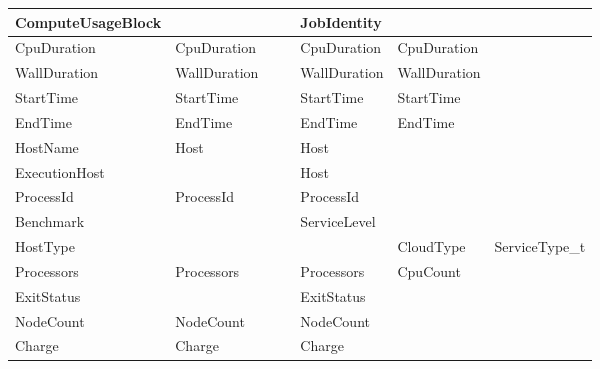 \begin{longtable}{ | p{} | p{} | p{} | p{} | p{} | p{} | p{} | }



\textbf{Compute\-Usage\-Block}& 		& 			&			& \textbf{JobIdentity}	& 						& \\ \hline
CpuDuration		& CpuDuration		& 			&			& CpuDuration		& CpuDuration					& \\ \hline
WallDuration		& WallDuration		& 			&			& WallDuration		& WallDuration					& \\ \hline
StartTime		& StartTime		& 			&			& StartTime		& StartTime					& \\ \hline
EndTime			& EndTime		& 			&			& EndTime		& EndTime					& \\ \hline
HostName		& Host			&			&			& Host			& 						& \\ \hline
Execution\-Host		& 			&			&			& Host			& 						& \\ \hline

ProcessId		& ProcessId		& 			&			& ProcessId		& 						& \\ \hline
Benchmark               &			&                       &                       & ServiceLevel		&                                               & \\ \hline
HostType		& 			& 			&			& 			& CloudType					& ServiceType\_t\\ \hline
Processors		& Processors		& 			&			& Processors		& CpuCount					& \\ \hline
ExitStatus		& 			& 			&			& ExitStatus		& 						& \\ \hline
NodeCount		& NodeCount		& 			&			& NodeCount		& 						& \\ \hline
Charge			& Charge		& 			&			& Charge		& 						& \\ \hline\hline







\end{longtable}
